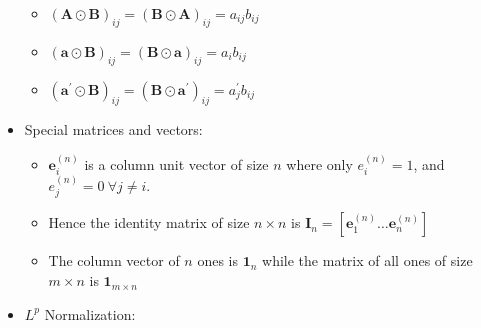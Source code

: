 \documentclass[fleqn]{article}
\begin{document}
\begin{itemize}
        \begin{itemize}
            \item $(\mathbf{A} \odot \mathbf{B})_{ij} =
                (\mathbf{B} \odot \mathbf{A})_{ij} =
                a_{ij} b_{ij}$
            \item $(\mathbf{a} \odot \mathbf{B})_{ij} =
                (\mathbf{B} \odot \mathbf{a})_{ij} =
                a_{i} b_{ij}$
            \item $(\mathbf{a}^{\prime} \odot \mathbf{B})_{ij} =
                (\mathbf{B} \odot \mathbf{a} ^{\prime})_{ij}  =
                a^{\prime}_{j} b_{ij}$
        \end{itemize}
    \item Special matrices and vectors:
        \begin{itemize}
            \item  $\mathbf{e}^{(n)}_i$ is a column unit vector of size $n$
                where only $e^{(n)}_i = 1$, and $e^{(n)}_j = 0 \ \forall j \neq i$.
            \item Hence the identity matrix of size $n \times n$ is
                $\mathbf{I}_{n} = \left[
                    \mathbf{e}^{(n)}_1
                    \dots
                    \mathbf{e}^{(n)}_n
                \right]$
            \item The column vector of $n$ ones is $\mathbf{1}_n$
                while the matrix of all ones of size $m \times n$ is $\mathbf{1}_{m \times n}$
        \end{itemize}
    \item $L^p$ Normalization:
\end{itemize}
\end{document}
